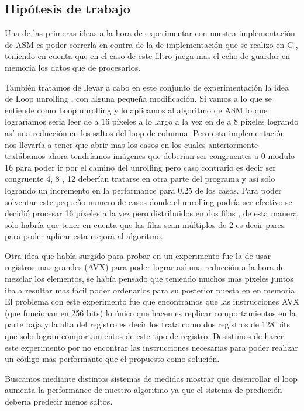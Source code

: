 \subsection{Hipótesis de trabajo}

Una de las primeras ideas a la hora de experimentar con nuestra implementación de ASM es poder correrla en contra de la de implementación que se realizo en C , teniendo en cuenta que en el caso de este filtro juega mas el echo de guardar en memoria los datos que de procesarlos.

También tratamos de llevar a cabo en este conjunto de experimentación la idea de Loop unrolling , con alguna pequeña modificación. Si vamos a lo que se entiende como Loop unrolling y lo aplicamos al algoritmo de ASM lo que lograríamos seria leer de a 16 píxeles a lo largo a la vez en de a 8 píxeles logrando así una reducción en los saltos del loop de columna. Pero esta implementación nos llevaría a tener que abrir mas los casos en los cuales anteriormente tratábamos ahora tendríamos imágenes que deberían ser congruentes a 0 modulo 16 para poder ir por el camino del unrolling pero caso contrario es decir ser congruente 4, 8 , 12 deberían tratarse en otra parte del programa y así solo logrando un incremento en la performance para 0.25 de los casos. Para poder solventar este pequeño numero de casos donde el unrolling podría ser efectivo se decidió procesar 16 píxeles a la vez pero distribuidos en dos filas , de esta manera solo habría que tener en cuenta que las filas sean múltiplos de 2 es decir pares para poder aplicar esta mejora al algoritmo.

Otra idea que había surgido para probar en un experimento fue la de usar registros mas grandes (AVX) para poder lograr así una reducción a la hora de mezclar los elementos, se había pensado que teniendo muchos mas píxeles juntos iba a resultar mas fácil poder ordenarlos para su posterior puesta en en memoria. El problema con este experimento fue que encontramos que las instrucciones AVX (que funcionan en 256 bits) lo único que hacen es replicar comportamientos en la parte baja y la alta del registro es decir los trata como dos registros de 128 bits que solo logran comportamientos de este tipo de registro. Desistimos de hacer este experimento por no encontrar las instrucciones necesarias para poder realizar un código mas performante que el propuesto como solución.

Buscamos mediante distintos sistemas de medidas mostrar que desenrollar el loop aumenta la performance de nuestro algoritmo ya que el sistema de predicción debería predecir menos saltos.

